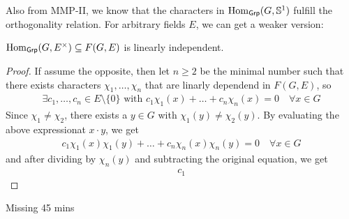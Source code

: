 Also from MMP-II, we know that the characters in $\operatorname{Hom}_{\text{\sffamily Grp}}(G,\mathbb{S}^{1})$ fulfill the orthogonality relation.
For arbitrary fields $E$, we can get a weaker version:

\begin{prop}[Dedekind]\label{prop:dedekind}
  $\operatorname{Hom}_{\text{\sffamily Grp}}(G,E^{\times}) \subseteq F(G,E)$ is linearly independent.
\end{prop}
\begin{proof}
  If assume the opposite, then let $n \geq 2$ be the minimal number such that there exists characters $\chi_1, \ldots, \chi_n$ that are linarly dependend in $F(G,E)$, so
  \begin{align*}
    \exists c_1, \ldots, c_n \in E \setminus \{0\} \text{ with } c_1 \chi_1(x) + \ldots + c_n \chi_n(x) = 0 \quad \forall x \in G
  \end{align*}
  Since $\chi_1 \neq \chi_2$, there exists a $y \in G$ with $\chi_1(y) \neq \chi_2(y)$.
  By evaluating the above expressionat $x \cdot y$, we get
  \begin{align*}
    c_1 \chi_1(x) \chi_1(y) + \ldots + c_n \chi_n(x) \chi_n(y) = 0 \quad \forall  x \in G
  \end{align*}
  and after dividing by $\chi_n(y)$ and subtracting the original equation, we get
  \begin{align*}
    c_1
  \end{align*}
\end{proof}
\begin{center}
Missing 45 mins
\end{center}
